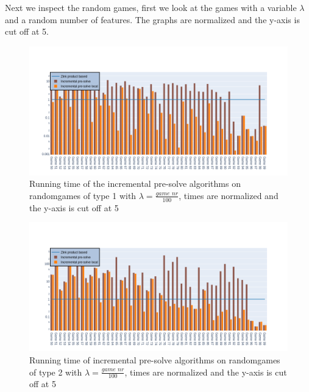 Next we inspect the random games, first we look at the games with a variable $\lambda$ and a random number of features. The graphs are normalized and the y-axis is cut off at 5.
\begin{figure}[H]
	\includegraphics[width=1\linewidth]{"results/FF_randomgames/Zlnk product based_Incremental pre-solve_Incremental pre-solve local_"}
	\caption{Running time of the incremental pre-solve algorithms on randomgames of type 1 with $\lambda = \frac{\textit{game nr}}{100}$, times are normalized and the y-axis is cut off at 5}
	\label{fig:elevatorzlnks}
\end{figure}%
\begin{figure}[H]
	\includegraphics[width=1\linewidth]{"results/FC_randomgames/Zlnk product based_Incremental pre-solve_Incremental pre-solve local_"}
	\caption{Running time of incremental pre-solve algorithms on randomgames of type 2 with $\lambda = \frac{\textit{game nr}}{100}$, times are normalized and the y-axis is cut off at 5}
	\label{fig:elevatorzlnks}
\end{figure}%

